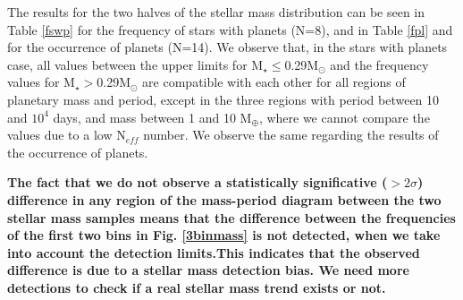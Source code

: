 \documentclass[structabstract]{aa}
\begin{document}
The results for the two halves of the stellar mass distribution can be seen in Table \ref{fswp} for the frequency of stars with planets (N=8), and in Table \ref{fpl} and for the occurrence of planets (N=14). We observe that, in the stars with planets case, all values between the upper limits for M$_{\star} \le $0.29M$_{\odot}$ and the frequency values  for M$_{\star} > $0.29M$_{\odot}$ are compatible with each other for all regions of planetary mass and period, except in the three regions with period between 10 and $10^{4}$ days, and mass between 1 and 10 M$_{\oplus}$, where we cannot compare the values due to a low N$_{eff}$ number. We observe the same regarding the results of the occurrence of planets. 

\textbf{The fact that we do not observe a statistically significative ($> 2\sigma$) difference in any region of the mass-period diagram between the two stellar mass samples means that the difference between the frequencies of the first two bins in Fig. \ref{3binmass} is not detected, when we take into account the detection limits.This indicates that the observed difference is due to a stellar mass detection bias. We need more detections to check if a real stellar mass trend exists or not.}

\end{document}
